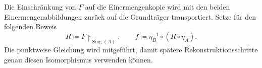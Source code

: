 \documentclass[main.tex]{subfiles}
\begin{document}
\par\noindent\begin{minipage}{\linewidth}
\end{minipage}\par
Die Einschränkung von \(F\) auf die Einermengenkopie wird mit den beiden
Einermengenabbildungen zurück auf die Grundträger transportiert. Setze
für den folgenden Beweis
\[
 R\coloneqq F\restriction_{\operatorname{Sing}(A)},\qquad
 f\coloneqq\eta_B^{-1}\circ(R\circ\eta_A).
\]
Die punktweise Gleichung wird mitgeführt, damit spätere
Rekonstruktionsschritte genau diesen Isomorphismus verwenden können.
\end{document}
